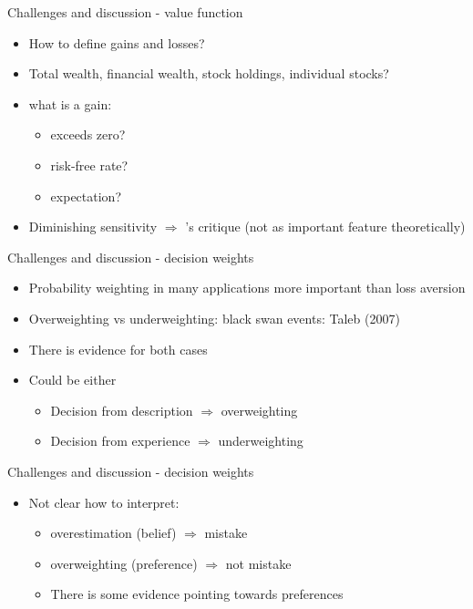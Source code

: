 \begin{frame}{Challenges and discussion - value function}
    \begin{itemize}
        \item How to define gains and losses?\bigskip
        \item Total wealth, financial wealth, stock holdings, individual stocks?\bigskip
        \item what is a gain:\medskip
        \begin{itemize}
            \item exceeds zero?\medskip
            \item risk-free rate?\medskip
            \item expectation?\medskip
        \end{itemize}
                \item Diminishing sensitivity  $\Rightarrow$ \citet{Rabin2000}'s critique (not as important feature theoretically)\medskip
        \end{itemize}
        \end{frame}

      \begin{frame}{Challenges and discussion - decision weights}
    \begin{itemize}
        \item Probability weighting in many applications more important than loss aversion\medskip
        \item Overweighting vs underweighting: black swan events: Taleb (2007)\medskip
        \item There is evidence for both cases\medskip
        \item Could be either \medskip
        \begin{itemize}
        \item Decision from description $\Rightarrow$ overweighting\smallskip
        \item Decision from experience $\Rightarrow$ underweighting\smallskip
        \end{itemize}
    \end{itemize}
\end{frame}


\begin{frame}{Challenges and discussion - decision weights}
    \begin{itemize}
        \item Not clear how to interpret:\medskip
          \begin{itemize}
        \item overestimation (belief) $\Rightarrow$ mistake\smallskip
        \item overweighting (preference) $\Rightarrow$ not mistake\smallskip
       \item There is some evidence pointing towards preferences
           \end{itemize}
    \end{itemize}
\end{frame}

